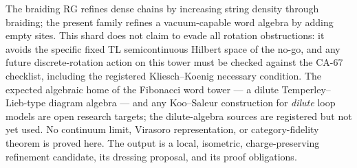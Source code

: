 The braiding RG refines dense chains by increasing string density through
braiding; the present family refines a vacuum-capable word algebra by adding
empty sites.  This shard does not claim to evade all rotation obstructions:
it avoids the specific fixed TL semicontinuous Hilbert space of the no-go,
and any future discrete-rotation action on this tower must be checked against
the CA-67 checklist, including the registered Kliesch--Koenig necessary
condition.  The expected algebraic home of the Fibonacci word tower --- a
dilute Temperley--Lieb-type diagram algebra --- and any Koo--Saleur
construction for \emph{dilute} loop models are open research targets; the
dilute-algebra sources are registered but not yet used.  No continuum limit,
Virasoro representation, or category-fidelity theorem is proved here.  The
output is a local, isometric, charge-preserving refinement candidate, its
dressing proposal, and its proof obligations.
